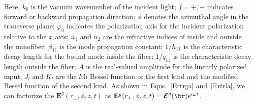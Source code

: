 \documentclass[]{report}
\begin{document}
Here, $ k_0 $ is the vacuum wavenumber of the incident light; $ f=+,- $ indicates forward or backward propagation direction; $ \phi $ denotes the azimuthal angle in the transverse plane; $ \varphi_0 $ indicates the polarization axis for the incident polarization relative to the $ x  $ axis; $ n_1 $ and $ n_2 $ are the refractive indices of inside and outside the nanofiber; $ \beta_{11} $ is the mode propagation constant; $ 1/h_{11} $ is the characteristic decay length for the bound mode inside the fiber; $ 1/q_{11} $ is the characteristic decay length outside the fiber; $ A $ is the real-valued amplitude for the linearly polarized input; $ J_l $ and $ K_l  $ are the $ l $th Bessel function of the first kind and the modified Bessel function of the second kind. As shown in Equs.~\ref{Ertrga} and~\ref{Ertrla}, we can factorize the $ \mathbf{E}^g(r_\perp,\phi,z,t) $ as $ \mathbf{E}^g(r_\perp,\phi,z,t)= \boldsymbol{\mathcal{E}}^g(\br)e^{i\omega t} $. 
\end{document}
